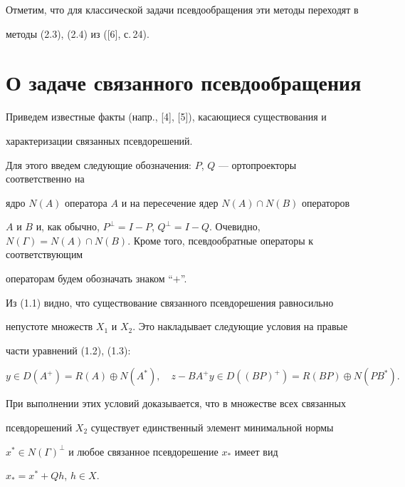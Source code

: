 Отметим, что для классической задачи псевдообращения эти методы переходят в 


методы (2.3), (2.4) из ([6], с.\,24).








\section{О задаче связанного псевдообращения}





Приведем известные факты (напр., [4], [5]), касающиеся существования и 


характеризации связанных псевдорешений.





Для этого введем следующие обозначения: $P$, $Q$ --- ортопроекторы соответственно на 


ядро $N(A)$ оператора $A$ и на пересечение ядер $N(A)\cap N(B)$ операторов 


$A$ и $B$ и, как обычно, $P^\bot =I-P$, $Q^\bot =I-Q$. Очевидно, $N(\Gamma)=


N(A)\cap N(B)$. Кроме того, псевдообратные операторы к соответствующим 


операторам будем обозначать знаком ``$+$''.





Из (1.1) видно, что существование связанного псевдорешения равносильно 


непустоте множеств $X_1$ и $X_2$. Это накладывает следующие условия на правые 


части уравнений (1.2), (1.3):


$$


y\in D(A^+)=R(A)\oplus N(A^*),\quad


z-BA^+y\in D((BP)^+)=R(BP)\oplus N(PB^*).


$$





При выполнении этих условий доказывается, что в множестве всех связанных 


псевдорешений $X_2$ существует единственный элемент минимальной нормы 


$x^*\in N(\Gamma)^\bot $ и любое связанное псевдорешение $x_*$ имеет вид 


$x_*=x^*+Qh$, $h\in X$.


